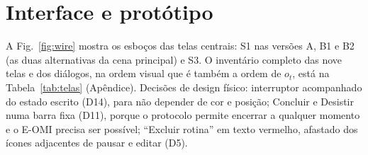 \documentclass[conference]{IEEEtran}
\begin{document}
\section{Interface e protótipo}\label{sec:prototipo}

A Fig.~\ref{fig:wire} mostra os esboços das telas centrais: S1 nas versões A, B1 e B2 (as duas alternativas da cena principal) e S3. O inventário completo das nove telas e dos diálogos, na ordem visual que é também a ordem de $o_t$, está na Tabela~\ref{tab:telas} (Apêndice). Decisões de design físico: interruptor acompanhado do estado escrito (D14), para não depender de cor e posição; Concluir e Desistir numa barra fixa (D11), porque o protocolo permite encerrar a qualquer momento e o E-OMI precisa ser possível; ``Excluir rotina'' em texto vermelho, afastado dos ícones adjacentes de pausar e editar (D5).
\end{document}

